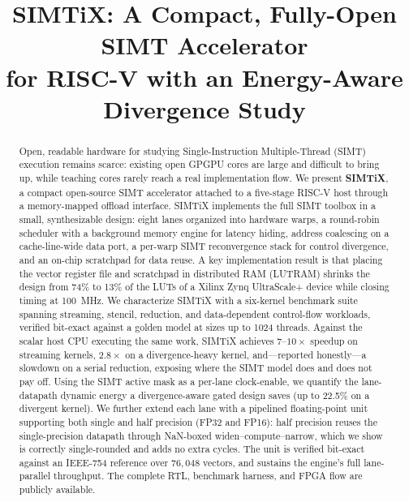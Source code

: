 \documentclass[conference]{IEEEtran}
\begin{document}
\title{SIMTiX: A Compact, Fully-Open SIMT Accelerator\\ for RISC-V with an Energy-Aware Divergence Study}

\author{
}

\maketitle

\begin{abstract}
Open, readable hardware for studying Single-Instruction Multiple-Thread (SIMT)
execution remains scarce: existing open GPGPU cores are large and difficult to
bring up, while teaching cores rarely reach a real implementation flow. We
present \textbf{SIMTiX}, a compact open-source SIMT accelerator attached to a
five-stage RISC-V host through a memory-mapped offload interface. SIMTiX
implements the full SIMT toolbox in a small, synthesizable design: eight lanes
organized into hardware warps, a round-robin scheduler with a background memory
engine for latency hiding, address coalescing on a cache-line-wide data port, a
per-warp SIMT reconvergence stack for control divergence, and an on-chip
scratchpad for data reuse. A key implementation result is that placing the
vector register file and scratchpad in distributed RAM (LUTRAM) shrinks the
design from 74\% to 13\% of the LUTs of a Xilinx Zynq UltraScale+ device while
closing timing at 100~MHz. We characterize SIMTiX with a six-kernel benchmark
suite spanning streaming, stencil, reduction, and data-dependent control-flow
workloads, verified bit-exact against a golden model at sizes up to 1024
threads. Against the scalar host CPU executing the same work, SIMTiX achieves
$7$--$10\times$ speedup on streaming kernels, $2.8\times$ on a
divergence-heavy kernel, and---reported honestly---a slowdown on a serial
reduction, exposing where the SIMT model does and does not pay off. Using the
SIMT active mask as a per-lane clock-enable, we quantify the lane-datapath
dynamic energy a divergence-aware gated design saves (up to 22.5\% on a
divergent kernel). We further extend each lane with a pipelined
floating-point unit supporting both single and half precision (FP32 and FP16):
half precision reuses the single-precision datapath through NaN-boxed
widen--compute--narrow, which we show is correctly single-rounded and adds no
extra cycles. The unit is verified bit-exact against an IEEE-754 reference over
$76{,}048$ vectors, and sustains the engine's full lane-parallel throughput. The
complete RTL, benchmark harness, and FPGA flow are publicly available.
\end{abstract}
\end{document}
